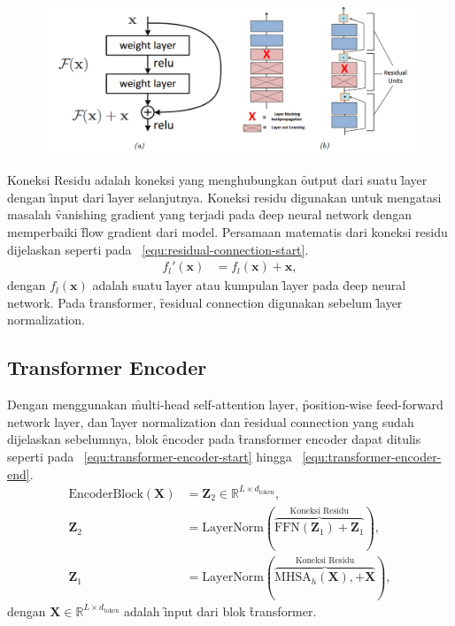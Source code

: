 	\begin{figure}
		\centering
		\includegraphics[width=1\textwidth]{assets/pics/residual-connection.png}
		\label{fig:residual-connection}
	\end{figure}
	Koneksi Residu adalah koneksi yang menghubungkan \f{output} dari suatu \f{layer} dengan \f{input} dari \f{layer} selanjutnya. Koneksi residu digunakan untuk mengatasi masalah \f{vanishing gradient} yang terjadi pada \f{deep neural network} dengan memperbaiki \f{flow gradient} dari model. Persamaan matematis dari koneksi residu dijelaskan seperti pada \equ~\ref{equ:residual-connection-start}.
	\begin{align}
		\label{equ:residual-connection-start}
		f_l'(\mathbf{x}) &= f_l(\mathbf{x}) + \mathbf{x},
	\end{align}
dengan $f_l(\mathbf{x})$ adalah suatu \f{layer} atau kumpulan \f{layer} pada \f{deep neural network}.
Pada \f{transformer}, \f{residual connection} digunakan sebelum \f{layer normalization}.

	\subsection{Transformer Encoder}
	\label{sec:encoder}

	Dengan menggunakan \f{multi-head self-attention layer}, \f{position-wise feed-forward network layer}, dan \f{layer normalization} dan \f{residual connection} yang sudah dijelaskan sebelumnya, blok \f{encoder} pada \f{transformer encoder} dapat ditulis seperti pada \equ~\ref{equ:transformer-encoder-start} hingga \equ~\ref{equ:transformer-encoder-end}.
	\begin{align}
	\text{EncoderBlock}(\mathbf{X}) &= \mathbf{Z}_2 \in \mathbb{R}^{L \times d_{\text{token}}}, \\
	\mathbf{Z}_2 &= \text{LayerNorm}(\overbrace{\text{FFN}(\mathbf{Z}_1)+\mathbf{Z}_1}^{\text{Koneksi Residu}}), \\
	\mathbf{Z}_1 &= \text{LayerNorm}(\overbrace{\text{MHSA}_h(\mathbf{X}), + \mathbf{X}}^{\text{Koneksi Residu}}),
	\end{align}
	dengan $\mathbf{X} \in \mathbb{R}^{L \times d_{\text{token}}}$ adalah \f{input} dari blok \f{transformer}.

